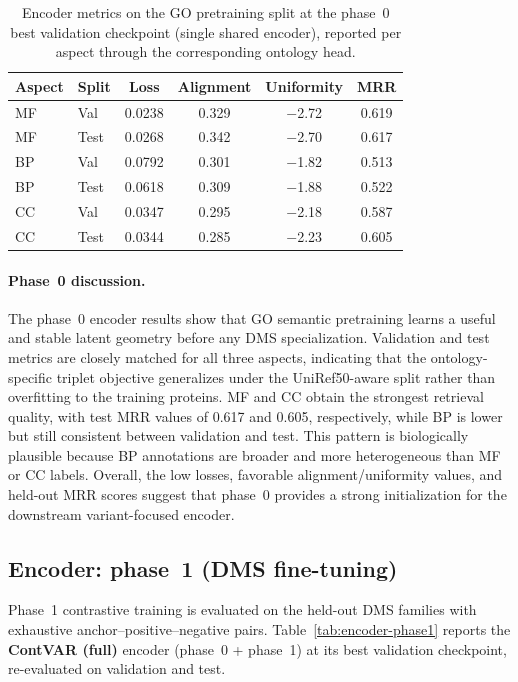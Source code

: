 \documentclass[11pt,a4paper]{article}
\begin{document}
\begin{table}[H]
\centering
\caption{Encoder metrics on the GO pretraining split at the phase~0 best validation checkpoint (single shared encoder), reported per aspect through the corresponding ontology head.}
\label{tab:encoder-phase0}
\begin{tabular}{llcccc}
\hline
Aspect & Split & Loss & Alignment & Uniformity & MRR \\
\hline
MF & Val  & 0.0238 & 0.329 & $-$2.72 & 0.619 \\
MF & Test & 0.0268 & 0.342 & $-$2.70 & 0.617 \\
BP & Val  & 0.0792 & 0.301 & $-$1.82 & 0.513 \\
BP & Test & 0.0618 & 0.309 & $-$1.88 & 0.522 \\
CC & Val  & 0.0347 & 0.295 & $-$2.18 & 0.587 \\
CC & Test & 0.0344 & 0.285 & $-$2.23 & 0.605 \\
\hline
\end{tabular}
\end{table}

\paragraph{Phase~0 discussion.}
The phase~0 encoder results show that GO semantic pretraining learns a useful and stable latent geometry before any DMS specialization. Validation and test metrics are closely matched for all three aspects, indicating that the ontology-specific triplet objective generalizes under the UniRef50-aware split rather than overfitting to the training proteins. MF and CC obtain the strongest retrieval quality, with test MRR values of 0.617 and 0.605, respectively, while BP is lower but still consistent between validation and test. This pattern is biologically plausible because BP annotations are broader and more heterogeneous than MF or CC labels. Overall, the low losses, favorable alignment/uniformity values, and held-out MRR scores suggest that phase~0 provides a strong initialization for the downstream variant-focused encoder.

\subsection{Encoder: phase~1 (DMS fine-tuning)}
Phase~1 contrastive training is evaluated on the held-out DMS families with exhaustive anchor--positive--negative pairs. Table~\ref{tab:encoder-phase1} reports the \textbf{ContVAR (full)} encoder (phase~0 + phase~1) at its best validation checkpoint, re-evaluated on validation and test.
\end{document}

